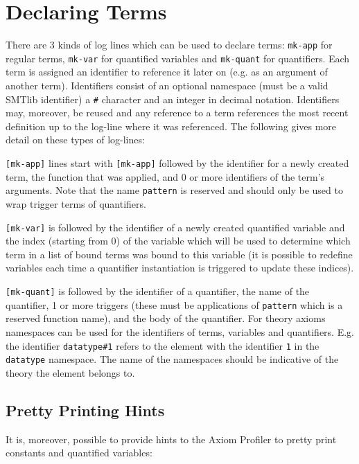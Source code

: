 \documentclass[orivec]{llncs}
\def\noskip{\vspace{-12pt}}
\begin{document}
\section{Declaring Terms}
\noskip
There are 3 kinds of log lines which can be used to declare terms: \texttt{mk-app} for regular terms, \texttt{mk-var} for quantified variables and \texttt{mk-quant} for quantifiers. Each term is assigned an identifier to reference it later on (e.g. as an argument of another term). Identifiers consist of an optional namespace (must be a valid SMTlib identifier) a \texttt{\#} character and an integer in decimal notation. Identifiers may, moreover, be reused and any reference to a term references the most recent definition up to the log-line where it was referenced. The following gives more detail on these types of log-lines:

\texttt{[mk-app]} lines start with \texttt{[mk-app]} followed by the identifier for a newly created term, the function that was applied, and 0 or more identifiers of the term's arguments. Note that the name \texttt{pattern} is reserved and should only be used to wrap trigger terms of quantifiers.

\texttt{[mk-var]} is followed by the identifier of a newly created quantified variable and the index (starting from 0) of the variable which will be used to determine which term in a list of bound terms was bound to this variable (it is possible to redefine variables each time a quantifier instantiation is triggered to update these indices).

\texttt{[mk-quant]} is followed by the identifier of a quantifier, the name of the quantifier, 1 or more triggers (these must be applications of \texttt{pattern} which is a reserved function name), and the body of the quantifier. For theory axioms namespaces can be used for the identifiers of terms, variables and quantifiers. E.g. the identifier \texttt{datatype\#1} refers to the element with the identifier \texttt{1} in the \texttt{datatype} namespace. The name of the namespaces should be indicative of the theory the element belongs to.

\subsection{Pretty Printing Hints}
\noskip
It is, moreover, possible to provide hints to the Axiom Profiler to pretty print constants and quantified variables:
\end{document}
